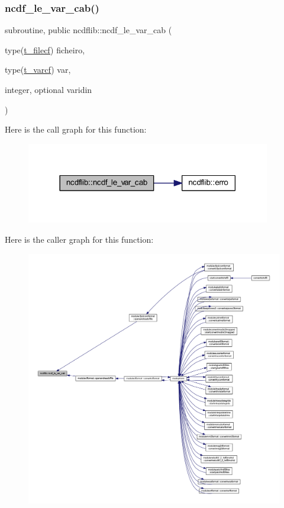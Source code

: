 \subsubsection{\texorpdfstring{ncdf\+\_\+le\+\_\+var\+\_\+cab()}{ncdf\_le\_var\_cab()}}
{\footnotesize\ttfamily subroutine, public ncdflib\+::ncdf\+\_\+le\+\_\+var\+\_\+cab (\begin{DoxyParamCaption}\item[{type(\mbox{\hyperlink{structncdflib_1_1t__filecf}{t\+\_\+filecf}})}]{ficheiro,  }\item[{type(\mbox{\hyperlink{structncdflib_1_1t__varcf}{t\+\_\+varcf}})}]{var,  }\item[{integer, optional}]{varidin }\end{DoxyParamCaption})}

Here is the call graph for this function\+:\nopagebreak
\begin{figure}[H]
\begin{center}
\leavevmode
\includegraphics[width=302pt]{namespacencdflib_add9998fa9d635bb8d35f562f55be98a3_cgraph}
\end{center}
\end{figure}
Here is the caller graph for this function\+:\nopagebreak
\begin{figure}[H]
\begin{center}
\leavevmode
\includegraphics[width=350pt]{namespacencdflib_add9998fa9d635bb8d35f562f55be98a3_icgraph}
\end{center}
\end{figure}


